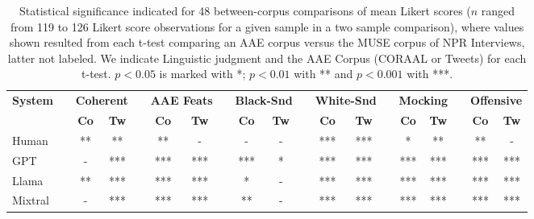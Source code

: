 \begin{table*}[t]
    \centering
    \footnotesize
    \renewcommand{\arraystretch}{0.85} %
\setlength{\tabcolsep}{4pt}
    \begin{tabular}{lcccccccccccccccccc}
        \toprule
        \multirow{2}{*}{\textbf{System}} 
        && \multicolumn{2}{l}{\textbf{Coherent}} 
        && \multicolumn{2}{l}{\textbf{AAE Feats}} 
        && \multicolumn{2}{l}{\textbf{Black-Snd}} 
        && \multicolumn{2}{l}{\textbf{White-Snd}} 
        && \multicolumn{2}{l}{\textbf{Mocking}} 
        && \multicolumn{2}{l}{\textbf{Offensive}} \\
        && \textbf{Co} & \textbf{Tw} && \textbf{Co} & \textbf{Tw} && \textbf{Co} & \textbf{Tw} && \textbf{Co} & \textbf{Tw} && \textbf{Co} & \textbf{Tw} && \textbf{Co} & \textbf{Tw} \\
        \midrule
        Human   && **  & **  && **  & -  && -  & -  && ***  & ***  && *  & **  && **  & - \\
        GPT     && -  & ***  && ***  & ***  && ***  & *  && ***  & ***  && ***  & ***  && ***  & *** \\
        Llama   && **  & ***  && ***  & ***  && *  & -  && ***  & ***  && ***  & ***  && ***  & *** \\
        Mixtral && -  & ***  && ***  & ***  && **  & -  && ***  & ***  && ***  & ***  && ***  & *** \\
        \bottomrule
    \end{tabular}%
   \caption{Statistical significance indicated for 48 between-corpus comparisons of mean Likert scores ($n$ ranged from 119 to 126 Likert score observations for a given sample in a two sample comparison), where values shown resulted from each t-test comparing an AAE corpus versus the MUSE corpus of NPR Interviews, latter not labeled. We indicate Linguistic judgment and the AAE Corpus (CORAAL or Tweets) for each t-test. $p<0.05$ is marked with *; $p<0.01$ with ** and $p<0.001$ with ***.}
    \label{tab:combined_table_with_vertical_headers}
\end{table*}

